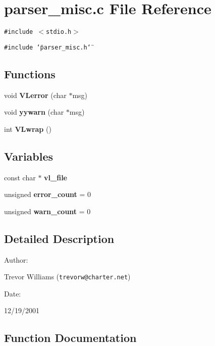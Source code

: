 \section{parser\_\-misc.c File Reference}
\label{parser__misc_8c}
{\tt \#include $<$stdio.h$>$}\par
{\tt \#include \char`\"{}parser\_\-misc.h\char`\"{}}\par
\subsection*{Functions}
\begin{CompactItemize}
\item 
void {\bf VLerror} (char $\ast$msg)
\item 
void {\bf yywarn} (char $\ast$msg)
\item 
int {\bf VLwrap} ()
\end{CompactItemize}
\subsection*{Variables}
\begin{CompactItemize}
\item 
const char $\ast$ {\bf vl\_\-file}
\item 
unsigned {\bf error\_\-count} = 0
\item 
unsigned {\bf warn\_\-count} = 0
\end{CompactItemize}


\subsection{Detailed Description}


\begin{Desc}
\item[Author: ]\par
Trevor Williams ({\tt trevorw@charter.net}) \end{Desc}
\begin{Desc}
\item[Date: ]\par
12/19/2001\end{Desc}


\subsection{Function Documentation}
